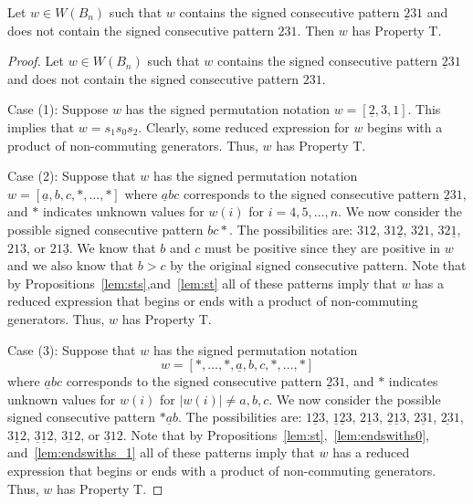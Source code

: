 \begin{proposition}\label{lem:231}
Let $w \in W(B_n)$ such that $w$ contains the signed consecutive pattern $\underline{2}31$ and does not contain the signed consecutive pattern $231$. Then $w$ has Property T.
\begin{proof}
	Let $w \in W(B_n)$ such that $w$ contains the signed consecutive pattern $\underline{2}31$ and does not contain the signed consecutive pattern $231$.
	
	Case (1): Suppose $w$ has the signed permutation notation $w=[\underline{2},3,1]$. This implies that $w=s_1s_0s_2$. Clearly, some reduced expression for $w$ begins with a product of non-commuting generators. Thus, $w$ has Property T.
	
	Case (2): Suppose that $w$ has the signed permutation notation $w=[\underline{a},b,c, \ast, \ldots, \ast]$ where $\underline{a}bc$ corresponds to the signed consecutive pattern $\underline{2}31$, and $\ast$ indicates unknown values for $w(i)$ for $i=4,5, \ldots, n$. We now consider the possible signed consecutive pattern $bc \ast$. The possibilities are: $312$, $31\underline{2}$, $321$, $32\underline{1}$, $213$, or $21\underline{3}$. We know that $b$ and $c$ must be positive since they are positive in $w$ and we also know that $b>c$ by the original signed consecutive pattern. Note that by Propositions~\ref{lem:sts},and~\ref{lem:st} all of these patterns imply that $w$ has a reduced expression that begins or ends with a product of non-commuting generators. Thus, $w$ has Property T.
	
	Case (3): Suppose that $w$ has the signed permutation notation 
	\[w=[\ast, \ldots, \ast, \underline{a},b,c, \ast, \ldots, \ast]\] where $\underline{a}bc$ corresponds to the signed consecutive pattern $\underline{2}31$, and $\ast$ indicates unknown values for $w(i)$ for $|w(i)|\neq a,b,c$. We now consider the possible signed consecutive pattern $\ast \underline{a}b$. The possibilities are: $1 \underline{2} 3$, $\underline{1} \underline{2}3$, $2 \underline{1} 3$, $\underline{2} \underline{1} 3$, $2 \underline{3}1$, $\underline{23}1$, $3 \underline{1} 2$, $\underline{3} \underline{1} 2$, $3 \underbar{1}2$, or $\underbar{31}2$. Note that by Propositions~\ref{lem:st},~\ref{lem:endswiths0}, and~\ref{lem:endswiths_1} all of these patterns imply that $w$ has a reduced expression that begins or ends with a product of non-commuting generators. Thus, $w$ has Property T. 
%	
\end{proof}	
\end{proposition}

